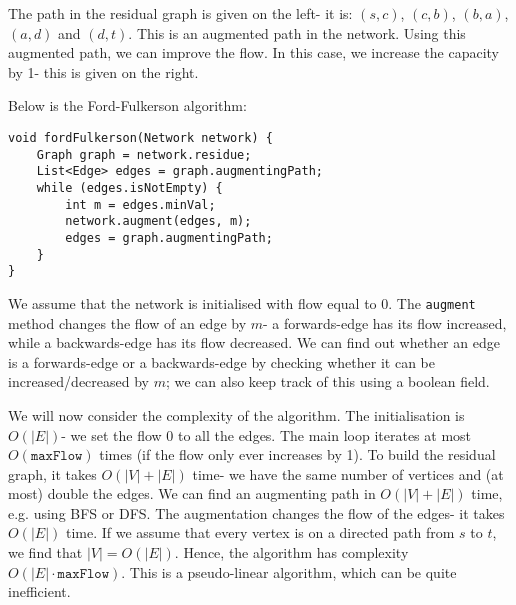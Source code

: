 \documentclass[a4paper, openany]{memoir}
\begin{document}
\begin{figure}[H]
\begin{subfigure}{0.45\textwidth}
\begin{scalebox}{0.8}
{
                }
            \end{scalebox}
        \end{subfigure}
    \end{figure}
    \noindent The path in the residual graph is given on the left- it is: $(s, c)$, $(c, b)$, $(b, a)$, $(a, d)$ and $(d, t)$. This is an augmented path in the network. Using this augmented path, we can improve the flow. In this case, we increase the capacity by 1- this is given on the right.

    Below is the Ford-Fulkerson algorithm:
\begin{lstlisting}[language=pseudocode]
void fordFulkerson(Network network) {
    Graph graph = network.residue;
    List<Edge> edges = graph.augmentingPath;
    while (edges.isNotEmpty) {
        int m = edges.minVal;
        network.augment(edges, m);
        edges = graph.augmentingPath;
    }
}
\end{lstlisting}
    We assume that the network is initialised with flow equal to 0. The \texttt{augment} method changes the flow of an edge by $m$- a forwards-edge has its flow increased, while a backwards-edge has its flow decreased. We can find out whether an edge is a forwards-edge or a backwards-edge by checking whether it can be increased/decreased by $m$; we can also keep track of this using a boolean field.

    We will now consider the complexity of the algorithm. The initialisation is $O(|E|)$- we set the flow 0 to all the edges. The main loop iterates at most $O(\texttt{maxFlow})$ times (if the flow only ever increases by 1). To build the residual graph, it takes $O(|V| + |E|)$ time- we have the same number of vertices and (at most) double the edges. We can find an augmenting path in $O(|V| + |E|)$ time, e.g. using BFS or DFS. The augmentation changes the flow of the edges- it takes $O(|E|)$ time. If we assume that every vertex is on a directed path from $s$ to $t$, we find that $|V| = O(|E|)$. Hence, the algorithm has complexity $O(|E| \cdot \texttt{maxFlow})$. This is a pseudo-linear algorithm, which can be quite inefficient.
\end{document}
